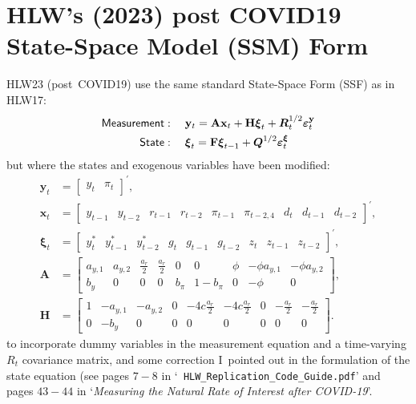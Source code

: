 \documentclass[a4paper,12pt]{article}
\begin{document}
\section{HLW's (2023) post COVID19 State-Space Model (SSM) Form}

HLW23 (post\ COVID19) use the same standard State-Space Form (SSF) as in
HLW17:%
\begin{align*}
\mathsf{Measurement}& :\quad \mathbf{y}_{t}=\mathbf{Ax}_{t}+\mathbf{H}%
\boldsymbol{\xi }_{t}+\boldsymbol{R}_{t}^{1/2}\boldsymbol{\varepsilon }_{t}^{%
\mathbf{y}} \\
\mathsf{State}& :\quad \boldsymbol{\xi }_{t}=\mathbf{F}\boldsymbol{\xi }%
_{t-1}+\boldsymbol{Q}^{1/2}\boldsymbol{\varepsilon }_{t}^{\boldsymbol{\xi }}
\end{align*}%
but where the states and exogenous variables have been modified:%
\begin{align*}
\mathbf{y}_{t}& =%
\begin{bmatrix}
y_{t} & \pi _{t}%
\end{bmatrix}%
^{\prime }, \\
\mathbf{x}_{t}& =%
\begin{bmatrix}
y_{t-1} & y_{t-2} & r_{t-1} & r_{t-2} & \pi _{t-1} & \pi _{t-2,4} & d_{t} & 
d_{t-1} & d_{t-2}%
\end{bmatrix}%
^{\prime }, \\
\boldsymbol{\xi }_{t}& =%
\begin{bmatrix}
y_{t}^{\ast } & y_{t-1}^{\ast } & y_{t-2}^{\ast } & g_{t} & g_{t-1} & g_{t-2}
& z_{t} & z_{t-1} & z_{t-2}%
\end{bmatrix}%
^{\prime }, \\
\mathbf{A}& =%
\begin{bmatrix}
a_{y,1} & a_{y,2} & \frac{a_{r}}{2} & \frac{a_{r}}{2} & 0 & 0 & \phi & -\phi
a_{y,1} & -\phi a_{y,2} \\ 
b_{y} & 0 & 0 & 0 & b_{\pi } & 1-b_{\pi } & 0 & -\phi & 0%
\end{bmatrix}%
, \\
\mathbf{H}& =%
\begin{bmatrix}
1 & -a_{y,1} & -a_{y,2} & 0 & -4c\frac{a_{r}}{2} & -4c\frac{a_{r}}{2} & 0 & -%
\frac{a_{r}}{2} & -\frac{a_{r}}{2} \\ 
0 & -b_{y} & 0 & 0 & 0 & 0 & 0 & 0 & 0%
\end{bmatrix}%
.
\end{align*}%
to incorporate dummy variables in the measurement equation and a
time-varying $R_{t}$ covariance matrix, and some correction I\ pointed out
in the formulation of the state equation (see pages $7-8$ in `\texttt{%
HLW\_Replication\_Code\_Guide.pdf}' and pages $43-44$ in `\emph{Measuring
the Natural Rate of Interest after COVID-19}'.
\end{document}
